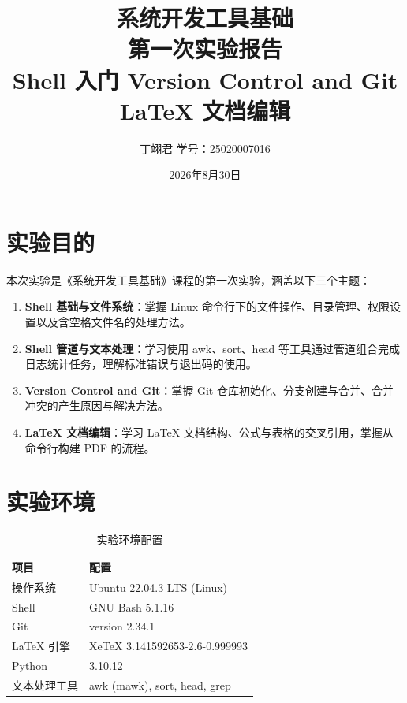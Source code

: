 \documentclass[12pt,a4paper]{article}
\title{\vspace{3cm}\Huge\textbf{系统开发工具基础}\\[0.5cm]
\LARGE 第一次实验报告\\[1cm]
\Large Shell 入门 \quad Version Control and Git \quad LaTeX 文档编辑}
\author{丁翊君 \quad 学号：25020007016}
\date{2026年8月30日}
\begin{document}
\maketitle
\thispagestyle{empty}
\newpage

\tableofcontents
\newpage

\section{实验目的}

本次实验是《系统开发工具基础》课程的第一次实验，涵盖以下三个主题：

\begin{enumerate}
    \item \textbf{Shell 基础与文件系统}：掌握 Linux 命令行下的文件操作、目录管理、权限设置以及含空格文件名的处理方法。
    \item \textbf{Shell 管道与文本处理}：学习使用 awk、sort、head 等工具通过管道组合完成日志统计任务，理解标准错误与退出码的使用。
    \item \textbf{Version Control and Git}：掌握 Git 仓库初始化、分支创建与合并、合并冲突的产生原因与解决方法。
    \item \textbf{LaTeX 文档编辑}：学习 LaTeX 文档结构、公式与表格的交叉引用，掌握从命令行构建 PDF 的流程。
\end{enumerate}

\section{实验环境}

\begin{table}[H]
\centering
\caption{实验环境配置}
\label{tab:env}
\begin{tabular}{ll}
\toprule
项目 & 配置 \\
\midrule
操作系统 & Ubuntu 22.04.3 LTS (Linux) \\
Shell & GNU Bash 5.1.16 \\
Git & version 2.34.1 \\
LaTeX 引擎 & XeTeX 3.141592653-2.6-0.999993 \\
Python & 3.10.12 \\
文本处理工具 & awk (mawk), sort, head, grep \\
\bottomrule
\end{tabular}
\end{table}
\end{document}
